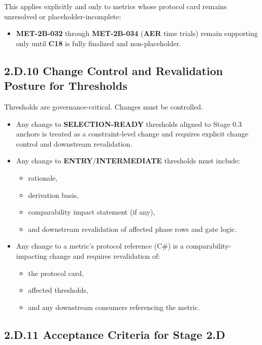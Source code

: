 \documentclass[10pt]{article}
\begin{document}
This applies explicitly and only to metrics whose protocol card remains unresolved or placeholder-incomplete:

\begin{itemize}
\item \textbf{MET-2B-032} through \textbf{MET-2B-034} (\textbf{AER} time trials) remain supporting only until \textbf{C18} is fully finalized and non-placeholder.
\end{itemize}
\clearpage
\subsection*{2.D.10 Change Control and Revalidation Posture for Thresholds}
{}

Thresholds are governance-critical. Changes must be controlled.

\begin{itemize}
\item Any change to \textbf{SELECTION-READY} thresholds aligned to Stage 0.3 anchors is treated as a constraint-level change and requires explicit change control and downstream revalidation.
\item Any change to \textbf{ENTRY}/\textbf{INTERMEDIATE} thresholds must include:
  \begin{itemize}
  \item rationale,
  \item derivation basis,
  \item comparability impact statement (if any),
  \item and downstream revalidation of affected phase rows and gate logic.
  \end{itemize}
\item Any change to a metric’s protocol reference (C\#) is a comparability-impacting change and requires revalidation of:
  \begin{itemize}
  \item the protocol card,
  \item affected thresholds,
  \item and any downstream consumers referencing the metric.
  \end{itemize}
\end{itemize}

\subsection*{2.D.11 Acceptance Criteria for Stage 2.D}
{}
\end{document}
